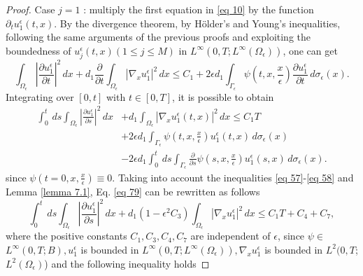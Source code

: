 \begin{proof}
Case $j=1$ : multiply the first equation in \eqref{eq 10} by the function $\partial_{t} u_{1}^{\epsilon}(t, x)$. By the divergence theorem, by Hölder's and Young's inequalities, following the same arguments of the previous proofs and exploiting the boundedness of $u_{j}^{\epsilon}(t, x)(1 \leq j \leq M)$ in $L^{\infty}\left(0, T ; L^{\infty}\left(\Omega_{\epsilon}\right)\right)$, one can get
\begin{equation}
  \int_{\Omega_{\epsilon}}\left|\frac{\partial u_{1}^{\epsilon}}{\partial t}\right|^{2} \, d  x+d_{1} \frac{\partial}{\partial t} \int_{\Omega_{\epsilon}}\left|\nabla_{x} u_{1}^{\epsilon}\right|^{2} \, d  x \leq C_{1}+2 \epsilon d_{1} \int_{\Gamma_{\epsilon}} \psi\left(t, x, \frac{x}{\epsilon}\right) \frac{\partial u_{1}^{\epsilon}}{\partial t} \, d  \sigma_{\epsilon}(x).
\label{eq 78}\end{equation}
Integrating over $[0, t]$ with $t \in[0, T]$, it is possible to obtain
\begin{equation}
  \begin{aligned}
\int_{0}^{t} \, d  s \int_{\Omega_{\epsilon}}\left|\frac{\partial u_{1}^{\epsilon}}{\partial s}\right|^{2} \, d  x &+d_{1} \int_{\Omega_{\epsilon}}\left|\nabla_{x} u_{1}^{\epsilon}(t, x)\right|^{2} \, d  x \leq C_{1} T \\
&+2 \epsilon d_{1} \int_{\Gamma_{\epsilon}} \psi\left(t, x, \frac{x}{\epsilon}\right) u_{1}^{\epsilon}(t, x) \, {d} \sigma_{\epsilon}(x) \\
&-2 \epsilon d_{1} \int_{0}^{t} \, d  s \int_{\Gamma_{\epsilon}} \frac{\partial}{\partial s} \psi\left(s, x, \frac{x}{\epsilon}\right) u_{1}^{\epsilon}(s, x) \, {d} \sigma_{\epsilon}(x).
\end{aligned}
\label{eq 79}\end{equation}
since $\psi\left(t=0, x, \frac{x}{\epsilon}\right) \equiv 0$. Taking into account the inequalities \eqref{eq 57}-\eqref{eq 58} and Lemma \eqref{lemma 7.1}, Eq. \eqref{eq 79} can be rewritten as follows
\begin{equation}
  \int_{0}^{t} \, d  s \int_{\Omega_{\epsilon}}\left|\frac{\partial u_{1}^{\epsilon}}{\partial s}\right|^{2} \, d  x+d_{1}\left(1-\epsilon^{2} C_{3}\right) \int_{\Omega_{\epsilon}}\left|\nabla_{x} u_{1}^{\epsilon}\right|^{2} \, d  x \leq C_{1} T+C_{4}+C_{7},
\label{eq 80}\end{equation}
where the positive constants $C_{1}, C_{3}, C_{4}, C_{7}$ are independent of $\epsilon$, since $\psi \in$ $L^{\infty}(0, T ; B), u_{1}^{\epsilon}$ is bounded in $L^{\infty}\left(0, T ; L^{\infty}\left(\Omega_{\epsilon}\right)\right), \nabla_{x} u_{1}^{\epsilon}$ is bounded in $L^{2}(0, T$; $L^{2}\left(\Omega_{\epsilon}\right)$) and the following inequality holds

\end{proof}
